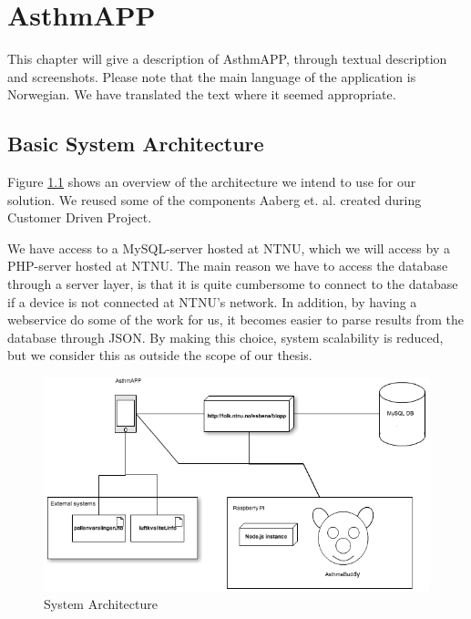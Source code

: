 \chapter{AsthmAPP}
\label{chp:description}

This chapter will give a description of AsthmAPP, through textual description and screenshots. Please note that the main language of the application is Norwegian. We have translated the text where it seemed appropriate. 

\section{Basic System Architecture}
\label{sec:architecture}
Figure \ref{fig:basic-architecture} shows an overview of the architecture we intend to use for our solution. We reused some of the components Aaberg et. al. created during Customer Driven Project\cite{CustomerDriven}. 

We have access to a MySQL-server hosted at NTNU, which we will access by a PHP-server hosted at NTNU. The main reason we have to access the database through a server layer, is that it is quite cumbersome to connect to the database if a device is not connected at NTNU's network. In addition, by having a webservice do some of the work for us, it becomes easier to parse results from the database through JSON. By making this choice, system scalability is reduced, but we consider this as outside the scope of our thesis.    

\begin{figure}
		\centering
			\includegraphics[width=0.60\paperwidth]{Pictures/system-architecture.png}
		\caption{System Architecture}
		\label{fig:basic-architecture}
\end{figure}

